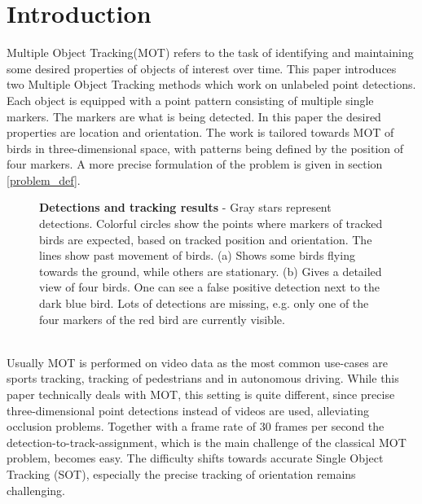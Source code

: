 \documentclass{article}
\begin{document}
\section{Introduction}
Multiple Object Tracking(MOT) refers to the task of identifying and maintaining some desired properties of objects of interest over time.
This paper introduces two Multiple Object Tracking methods which work on unlabeled point detections. Each object is equipped with a point pattern consisting of multiple single markers. The markers are what is being detected. In this paper the desired properties are location and orientation. The work is tailored towards MOT of birds in three-dimensional space, with patterns being defined by the position of four markers. A more precise formulation of the problem is given in section \ref{problem_def}.
\begin{figure}[!htbp]
	\begin{center}
		
	\end{center}
	\caption{\textbf{Detections and tracking results} - Gray stars represent detections. Colorful circles show the points where markers of tracked birds are expected, based on tracked position and orientation. The lines show past movement of birds. (a) Shows some birds flying towards the ground, while others are stationary. (b) Gives a detailed view of four birds. One can see a false positive detection next to the dark blue bird. Lots of detections are missing, e.g. only one of the four markers of the red bird are currently visible.}
	\label{data_impression}
\end{figure} \\
Usually MOT is performed on video data as the most common use-cases are sports tracking, tracking of pedestrians and in autonomous driving. While this paper technically deals with MOT, this setting is quite different, since precise three-dimensional point detections instead of videos are used, alleviating occlusion problems. Together with a frame rate of 30 frames per second the detection-to-track-assignment, which is the main challenge of the classical MOT problem, becomes easy. The difficulty shifts towards accurate Single Object Tracking (SOT), especially the precise tracking of orientation remains challenging. 
\\
\end{document}
